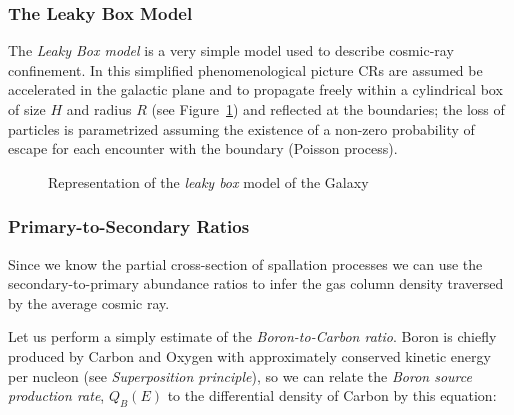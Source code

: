 \documentclass[
  letterpaper,
  DIV=11,
  numbers=noendperiod]{scrreprt}
\begin{document}
\subsubsection{The Leaky Box Model}\label{the-leaky-box-model}

The \emph{Leaky Box model} is a very simple model used to describe
cosmic-ray confinement. In this simplified phenomenological picture CRs
are assumed be accelerated in the galactic plane and to propagate freely
within a cylindrical box of size \(H\) and radius \(R\) (see
Figure~\ref{fig-leakybox}) and reflected at the boundaries; the loss of
particles is parametrized assuming the existence of a non-zero
probability of escape for each encounter with the boundary (Poisson
process).

\begin{figure}


\caption{\label{fig-leakybox}Representation of the \emph{leaky box}
model of the Galaxy}

\end{figure}%

\subsubsection{Primary-to-Secondary
Ratios}\label{primary-to-secondary-ratios}

Since we know the partial cross-section of spallation processes we can
use the secondary-to-primary abundance ratios to infer the gas column
density traversed by the average cosmic ray.

Let us perform a simply estimate of the \emph{Boron-to-Carbon ratio}.
Boron is chiefly produced by Carbon and Oxygen with approximately
conserved kinetic energy per nucleon (see \emph{Superposition
principle}), so we can relate the \emph{Boron source production rate},
\(Q_B(E)\) to the differential density of Carbon by this equation:
\end{document}
